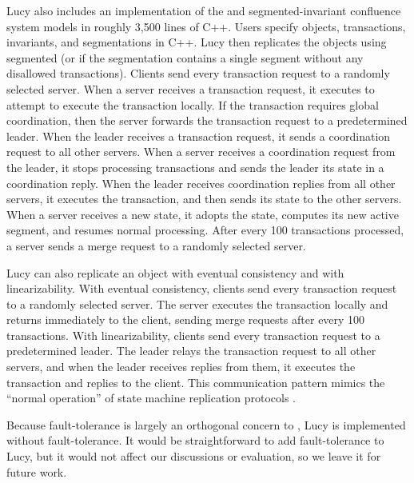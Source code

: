 Lucy also includes an implementation of the \invariantconfluence{} and
segmented-invariant confluence system models in roughly 3,500 lines of C++.
Users specify objects, transactions, invariants, and segmentations in C++. Lucy
then replicates the objects using segmented \invariantconfluence{} (or
\invariantconfluence{} if the segmentation contains a single segment without any
disallowed transactions). Clients send every transaction request to a randomly
selected server. When a server receives a transaction request, it executes
 to attempt to execute the transaction locally. If the
transaction requires global coordination, then the server forwards the
transaction request to a predetermined leader. When the leader receives a
transaction request, it sends a coordination request to all other servers. When
a server receives a coordination request from the leader, it stops processing
transactions and sends the leader its state in a coordination reply. When the
leader receives coordination replies from all other servers, it executes the
transaction, and then sends its state to the other servers. When a server
receives a new state, it adopts the state, computes its new active segment, and
resumes normal processing. After every 100 transactions processed, a server
sends a merge request to a randomly selected server.

Lucy can also replicate an object with eventual consistency and with
linearizability. With eventual consistency, clients send every transaction
request to a randomly selected server. The server executes the transaction
locally and returns immediately to the client, sending merge requests after
every 100 transactions. With linearizability, clients send every transaction
request to a predetermined leader. The leader relays the transaction request to
all other servers, and when the leader receives replies from them, it executes
the transaction and replies to the client. This communication pattern mimics
the ``normal operation'' of state machine replication protocols
\cite{lamport1998part, liskov2012viewstamped}.

Because fault-tolerance is largely an orthogonal concern to
\invariantconfluence{}, Lucy is implemented without fault-tolerance. It would be
straightforward to add fault-tolerance to Lucy, but it would not affect our
discussions or evaluation, so we leave it for future work.

